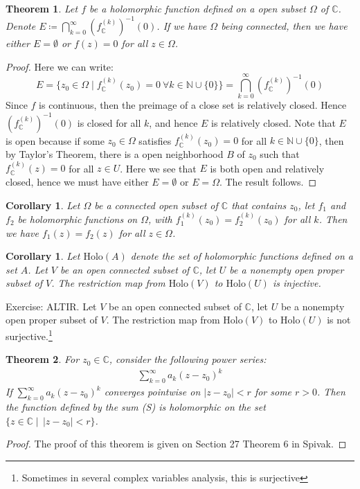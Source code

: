 \documentclass[11pt,oneside]{book}
\theoremstyle{break}
\theoremstyle{break}
\newtheorem{thm}{Theorem}[section]
\newtheorem{corT}[lem]{Corollary}
\newcommand{\N}{\mathbb{N}}
\newcommand{\Complex}{\mathbb{C}}
\newcommand{\exercise}{\color{green}Exercise: \color{black}}
\begin{document}
\newpage
\begin{thm}
Let $f$ be a holomorphic function defined on a open subset $\Omega$ of $\Complex$. Denote $E \coloneqq  \bigcap_{k=0}^\infty (f_{\Complex}^{(k)})^{-1}(0)$. If we have $\Omega$ being connected, then we have either $E = \emptyset$ or $f(z)= 0$ for all $z\in \Omega$. 
\end{thm}
\begin{proof}
Here we can write:
$$E = \{ z_0 \in \Omega \mid f_{\Complex}^{(k)}(z_0)=0 \ \forall k\in \N\cup \{0\} \} = \bigcap_{k=0}^\infty (f_{\Complex}^{(k)})^{-1}(0)$$
Since $f$ is continuous, then the preimage of a close set is relatively closed. Hence $(f_{\Complex}^{(k)})^{-1}(0)$ is closed for all $k$, and hence $E$ is relatively closed. Note that $E$ is open because if some $z_0 \in \Omega$ satisfies $f^{(k)}_{\Complex}(z_0) = 0$ for all $k \in \N \cup \{0\}$, then by Taylor's Theorem, there is a open neighborhood $B$ of $z_0$ such that $f^{(k)}_{\Complex}(z) = 0$ for all $z \in U$. Here we see that $E$ is both open and relatively closed, hence we must have either $E = \emptyset$ or $E = \Omega$. The result follows.
\end{proof}

\begin{corT}
Let $\Omega$ be a connected open subset of $\Complex$ that contains $z_0$, let $f_1$ and $f_2$ be holomorphic functions on $\Omega$, with $f_1^{(k)}(z_0) = f_2^{(k)}(z_0)$ for all $k$. 	Then we have $f_1(z) = f_2(z)$ for all $z \in \Omega$. 
\end{corT}

\begin{corT}
Let $\text{Holo}(A)$ denote the set of holomorphic functions defined on a set $A$. Let $V$ be an open connected subset of $\Complex$, let $U$ be a nonempty open proper subset of $V$. The restriction map from $\text{Holo}(V)$ to $\text{Holo}(U)$ is injective.
\end{corT}

\exercise ALTIR. Let $V$ be an open connected subset of $\Complex$, let $U$ be a nonempty open proper subset of $V$. The restriction map from $\text{Holo}(V)$ to $\text{Holo}(U)$ is not surjective.\footnote{Sometimes in several complex variables analysis, this is surjective}

\begin{thm}
For $z_0 \in \Complex$, consider the following power series:
\begin{align*}
\sum_{k=0}^\infty a_k(z-z_0)^k \tag{S}
\end{align*}
If $\sum_{k=0}^\infty a_k(z-z_0)^k$ converges pointwise on $|z-z_0| <r$ for some $r >0$. Then the function defined by the sum (S) is holomorphic on the set $\{ z \in \Complex \mid \, |z-z_0|<r\}$. 
\end{thm}
\begin{proof}
The proof of this theorem is given on Section 27 Theorem 6 in Spivak.
\end{proof}
\end{document}
